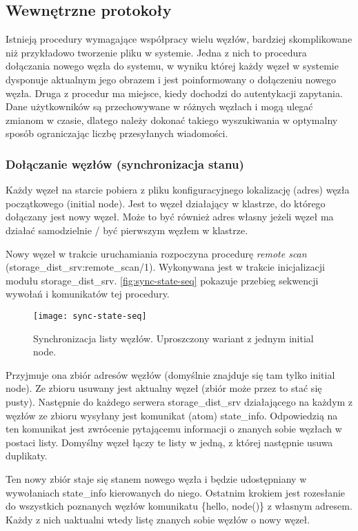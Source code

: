 \subsection{Wewnętrzne protokoły}
Istnieją procedury wymagające współpracy wielu węzłów, bardziej skomplikowane niż przykładowo tworzenie pliku w systemie. Jedna z nich to procedura dołączania nowego węzła do systemu, w wyniku której każdy węzeł w systemie dysponuje aktualnym jego obrazem i jest poinformowany o dołączeniu nowego węzła. Druga z procedur ma miejsce, kiedy dochodzi do autentykacji zapytania. Dane użytkowników są przechowywane w różnych węzłach i mogą ulegać zmianom w czasie, dlatego należy dokonać takiego wyszukiwania w optymalny sposób ograniczając liczbę przesyłanych wiadomości.

\subsubsection{Dołączanie węzłów (synchronizacja stanu)}
Każdy węzeł na starcie pobiera z pliku konfiguracyjnego lokalizację (adres) węzła początkowego (initial node). Jest to węzeł działający w klastrze, do którego dołączany jest nowy węzeł. Może to być również adres własny jeżeli węzeł ma działać samodzielnie / być pierwszym węzłem w klastrze.

Nowy węzeł w trakcie uruchamiania rozpoczyna procedurę \textit{remote scan} (storage\_dist\_srv:remote\_scan/1). Wykonywana jest w trakcie inicjalizacji modułu storage\_dist\_srv. \autoref{fig:sync-state-seq} pokazuje przebieg sekwencji wywołań i komunikatów tej procedury.

\begin{figure}[!htbp]
	\centering
	\texttt{[image: sync-state-seq]}
	\caption[Synchronizacja listy węzłów.]{Synchronizacja listy węzłów. Uproszczony wariant z jednym initial node.}
	\label{fig:sync-state-seq}
\end{figure}

Przyjmuje ona zbiór adresów węzłów (domyślnie znajduje się tam tylko initial node). Ze zbioru usuwany jest aktualny węzeł (zbiór może przez to stać się pusty). Następnie do każdego serwera storage\_dist\_srv działającego na każdym z węzłów ze zbioru wysyłany jest komunikat (atom) state\_info. Odpowiedzią na ten komunikat jest zwrócenie pytającemu informacji o znanych sobie węzłach w postaci listy. Domyślny węzeł łączy te listy w jedną, z której następnie usuwa duplikaty.

Ten nowy zbiór staje się stanem nowego węzła i będzie udostępniany w wywołaniach state\_info kierowanych do niego. Ostatnim krokiem jest rozesłanie do wszystkich poznanych węzłów komunikatu \{hello, node()\} z własnym adresem. Każdy z nich uaktualni wtedy listę znanych sobie węzłów o nowy węzeł.





